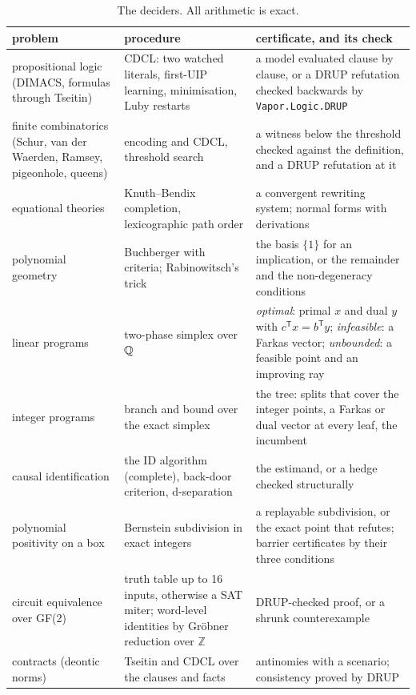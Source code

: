 \begin{table}[h]
\centering\small
\begin{tabularx}{\textwidth}{@{}>{\raggedright\arraybackslash}p{3.3cm}XX@{}}
\toprule
problem & procedure & certificate, and its check \\
\midrule
propositional logic (DIMACS, formulas through Tseitin) & CDCL: two watched literals, first-UIP learning, minimisation, Luby restarts & a model evaluated clause by clause, or a DRUP refutation checked backwards by \texttt{Vapor.Logic.DRUP} \\
finite combinatorics (Schur, van der Waerden, Ramsey, pigeonhole, queens) & encoding and CDCL, threshold search & a witness below the threshold checked against the definition, and a DRUP refutation at it \\
equational theories & Knuth--Bendix completion, lexicographic path order & a convergent rewriting system; normal forms with derivations \\
polynomial geometry & Buchberger with criteria; Rabinowitsch's trick & the basis $\{1\}$ for an implication, or the remainder and the non-degeneracy conditions \\
linear programs & two-phase simplex over $\mathbb{Q}$ & \emph{optimal}: primal $x$ and dual $y$ with $c^{\mathsf T}x = b^{\mathsf T}y$; \emph{infeasible}: a Farkas vector; \emph{unbounded}: a feasible point and an improving ray \\
integer programs & branch and bound over the exact simplex & the tree: splits that cover the integer points, a Farkas or dual vector at every leaf, the incumbent \\
causal identification & the ID algorithm (complete), back-door criterion, d-separation & the estimand, or a hedge checked structurally \\
polynomial positivity on a box & Bernstein subdivision in exact integers & a replayable subdivision, or the exact point that refutes; barrier certificates by their three conditions \\
circuit equivalence over GF(2) & truth table up to 16 inputs, otherwise a SAT miter; word-level identities by Gröbner reduction over $\mathbb{Z}$ & DRUP-checked proof, or a shrunk counterexample \\
contracts (deontic norms) & Tseitin and CDCL over the clauses and facts & antinomies with a scenario; consistency proved by DRUP \\
\bottomrule
\end{tabularx}
\caption{The deciders. All arithmetic is exact.}
\end{table}

